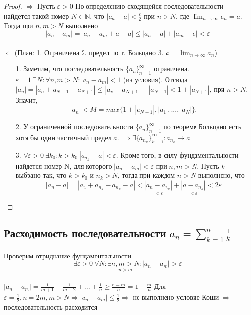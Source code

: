 \documentclass[12pt]{article}
\theoremstyle{definition}
\begin{document}
\begin{proof}
$\Longrightarrow$ Пусть $\varepsilon > 0$ По определению сходящейся последовательности найдется такой номер $N \in \mathds{N}$, что $|a_n - a| < \frac{\varepsilon}{2}$ при $n > N$, где $ \lim_{n\to\infty} a_n = a$. Тогда при $n, m > N$ выполнено $$|a_n - a_m| = |a_n - a_m + a - a| \leqslant |a_n - a| + |a_m - a| < \varepsilon$$ \\ $\Longleftarrow$(План: 1. Ограничена 2. предел по т. Больцано 3. $a = \lim_{n\to\infty}a_n$) \begin{itemize}
    \item[1.] Заметим, что последовательность $\{a_n\}_{n=1}^\infty$ ограничена. $\varepsilon = 1 \ \exists N: \forall n, m > N: |a_n - a_m| < 1$ (из условия). Отсюда $|a_n| = |a_n + a_{N+1} - a_{N+1}| \leqslant |a_n - a_{N+1}| + |a_{N+1}| < 1 + |a_{N+1}|$, при $n>N$. Значит, $$|a_n| < M = max\{1+|a_{N+1}|, |a_1|, ..., |a_N|\}.$$
    \item[2.]У ограниченной последовательности $\{a_n\}_{n=1}^\infty$ по теореме Больцано есть хотя бы один частичный предел $a$. $\Rightarrow \exists \{a_{n_{k}}\}_{k=1}^\infty: a_{n_{k}} \rightarrow a$
    \item[3.] $\forall \varepsilon > 0\ \exists k_0: k > k_0\ |a_{n_{k}} - a| < \varepsilon.$ Кроме того, в силу фундаментальности найдется номер N, для которого $|a_n - a_m| < \varepsilon$ при $n, m > N$. Пусть $k$ выбрано так, что $k > k_0$ и $n_k > N$, тогда при каждом $n > N$ выполнено, что $$|a_n - a| = |a_n + a_{n_{k}} - a_{n_{k}} - a| < \underset{<\varepsilon}{|a_n - a_{n_k}|} + \underset{<\varepsilon}{|a- a_{n_k}|} < 2\varepsilon$$
\end{itemize}
\end{proof}
\subsection{Расходимость последовательности $a_n = \sum^n_{k=1}\frac{1}{k}$} Проверим отридцание фундаментальности $$\exists \varepsilon > 0 \ \forall N: \exists \underset{n > m}{n,m > N}:|a_n - a_m| > \varepsilon$$ \\ $|a_n - a_m| = \frac{1}{m+1} + \frac{1}{m+2}+...+\frac{1}{n} 
\geqslant \frac{n-m}{n}= 1 - \frac{m}{n}$ Для $\varepsilon = \frac{1}{2}, n = 2m, m > N \Longrightarrow |a_n - a_m| \leqslant \frac{1}{2} \Longrightarrow$ не выполнено условие Коши $\Longrightarrow$ последовательность расходится
\end{document}
